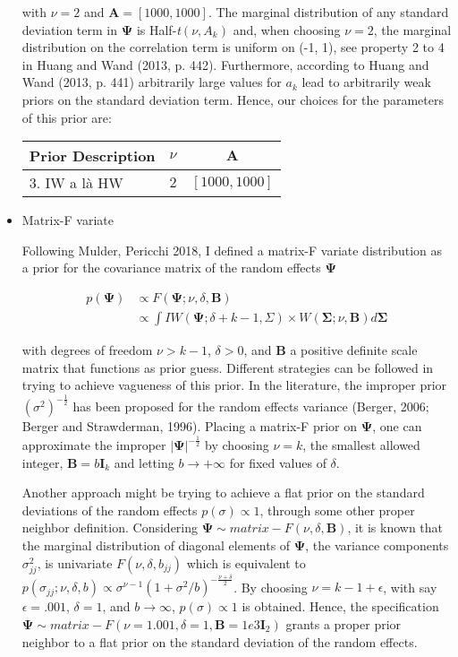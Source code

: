 \documentclass[a4paper]{article}
\begin{document}
\begin{itemize}
with $\nu = 2$ and $\bm{A} = [1000, 1000]$. The marginal distribution of any standard deviation term in $\bm{\Psi}$ is Half-\textit{t}$(\nu, A_k)$ and, when choosing $\nu = 2$, the marginal distribution on the correlation term is uniform on (-1, 1), see property 2 to 4 in Huang and Wand (2013, p. 442). Furthermore, according to Huang and Wand (2013, p. 441) arbitrarily large values for $a_k$ lead to arbitrarily weak priors on the standard deviation term. Hence, our choices for the parameters of this prior are: 
	
\begin{center}
\begin{tabular}{ c c c }
 Prior Description & $\nu$ & $\bm{A}$ \\ 
 \hline
 \multicolumn{1}{l}{3. IW a là HW} & $2$ & $[1000, 1000]$ \\  
 \hline
\end{tabular}
\end{center}	
	
	\item Matrix-F variate
	
Following Mulder, Pericchi 2018, I defined a matrix-F variate 
distribution as a prior for the covariance matrix of 	the random
effects $\bm{\Psi}$
	
\begin{equation}
\begin{split}
p(\bm{\Psi})& \propto F(\bm{\Psi}; \nu, \delta, \bm{B}) \\
& \propto \int IW(\bm{\Psi}; \delta + k - 1, \Sigma) \times W(\bm{\Sigma}; \nu, \bm{B})d\bm{\Sigma}
\end{split}
\end{equation}	

with degrees of freedom $\nu>k-1$, $\delta>0$, and $\bm{B}$ a 
positive definite scale matrix that functions as prior guess. 
Different strategies can be followed in trying to achieve vagueness
of this prior. In the literature, the improper prior $(\sigma
^2)^{-\frac{1}{2}}$ has been proposed for the random effects
variance (Berger, 2006; Berger and Strawderman, 1996). %
Placing a matrix-F prior on $\bm{\Psi}$, one can approximate
the improper $|\bm{\Psi}|^{-\frac{1}{2}}$ by choosing $\nu=k$,
the smallest allowed integer, $\bm{B}=b\bm{I}_k$ and letting
$b \rightarrow +\infty$ for fixed values of $\delta$.

Another approach might be trying to achieve a flat prior on the
standard deviations of the random effects $p(\sigma) \propto 
1$, through some other proper neighbor definition. Considering
$\bm{\Psi} \sim matrix-F(\nu, \delta, \bm{B})$, it is known that
the marginal distribution of diagonal elements of $\bm{\Psi}$,
the variance components $\sigma^2_{jj}$, is univariate $F(\nu, 
\delta, b_{jj})$ which is equivalent to $p(\sigma_{jj};\nu, \delta, 
b) \propto \sigma^{\nu-1}(1+\sigma^2/b)^{-\frac{\nu+\delta}{2}}$.
By choosing $\nu = k-1+\epsilon$, with say $\epsilon = .001$,
$\delta = 1$, and $b \rightarrow \infty$, $p(\sigma) \propto 1$
is obtained. Hence, the specification $\bm{\Psi} \sim matrix
-F(\nu = 1.001, \delta = 1, \bm{B} = 1e3\bm{I}_2)$ grants a 
proper prior neighbor to a flat prior on the standard deviation
of the random effects.


\end{itemize}
\end{document}
